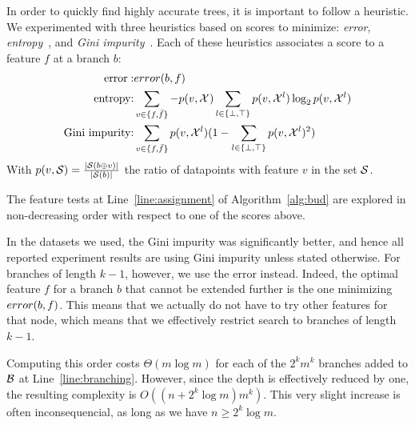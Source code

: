 \documentclass{llncs}
\newcommand{\setex}[1]{\ensuremath{{\mathcal X}^{#1}}\xspace}
\newcommand{\allex}{{\setex{}}\xspace}
\newcommand{\bud}[0]{\ensuremath{{\cal B}}}
\newcommand{\afeat}[0]{\ensuremath{f}}
\newcommand{\aclass}[0]{\ensuremath{l}}
\newcommand{\error}[1][]{\ensuremath{\ifthenelse{\equal{#1}{}}{{error}}{{error({{#1}})}}}}
\newcommand{\abranch}[0]{\ensuremath{b}}
\newcommand{\numex}[0]{\ensuremath{n}}
\newcommand{\numfeat}[0]{\ensuremath{m}}
\newcommand{\mdepth}[0]{\ensuremath{k}}
\newcommand{\grow}[2]{\ensuremath{{#1}\oplus{#2}}}
\begin{document}
In order to quickly find highly accurate trees, it is important to follow a heuristic. We experimented with three heuristics based on scores to minimize: \emph{error}, \emph{entropy}~\cite{10.1023/A:1022643204877}, and \emph{Gini impurity}~\cite{breiman1984classification}. 
Each of these heuristics associates a score to a feature $\afeat$ at a branch $\abranch$:
\begin{eqnarray}
	\textrm{error}: & \error[\abranch,\afeat] \\
	\textrm{entropy:} & \sum\limits_{v \in \{\afeat,\bar{\afeat}\}} -p(v,\allex) \sum\limits_{\aclass \in \{\bot,\top\}} p(v,\setex{\aclass}) \log_{2} p(v,\setex{\aclass}) \\
	\textrm{Gini impurity:} &  \sum\limits_{v \in \{\afeat,\bar{\afeat}\}} p(v,\setex{\aclass})(1 - \sum\limits_{\aclass \in \{\bot,\top\}} p(v,\setex{\aclass})^2)
\end{eqnarray}
With $p(v,{\cal S}) = \frac{|{\cal S}(\grow{\abranch}{v})|}{|{\cal S}(\abranch)|}$ the ratio of datapoints with feature $v$ in the set ${\cal S}$.

The feature tests at Line~\ref{line:assignment} of Algorithm~\ref{alg:bud} are explored in non-decreasing order with respect to one of the scores above.


In the datasets we used, the Gini impurity was significantly better, and hence all reported experiment results are using Gini impurity unless stated otherwise. For branches of length $\mdepth-1$, however, we use the error instead. Indeed, the optimal feature $\afeat$ for a branch $\abranch$ that cannot be extended further is the one minimizing $\error[\abranch,\afeat]$. This means that we actually do not have to try other features for that node, which means that we effectively restrict search to branches of length $\mdepth-1$.


Computing this order costs $\Theta(\numfeat \log \numfeat)$ for each of the $2^{\mdepth}\numfeat^{\mdepth}$ branches added to $\bud$ at Line~\ref{line:branching}. However, since the depth is effectively reduced by one, the resulting complexity 
is $O((\numex + 2^{\mdepth} \log \numfeat) \numfeat^{\mdepth})$. This very slight increase is often inconsequencial, as long as we have $\numex \geq 2^{\mdepth} \log \numfeat$.
\end{document}
